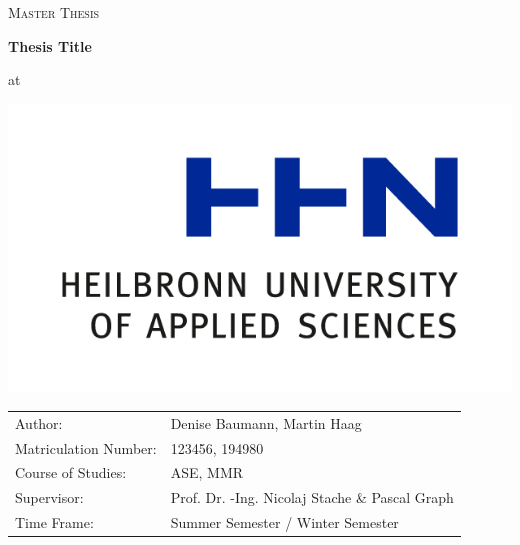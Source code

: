 \thispagestyle{title_page}
\vspace*{2cm}
\begin{center}
{\scshape\LARGE Master Thesis \par}
\vspace{1cm}
{\huge\bfseries Thesis Title\par}
\vspace{1.5cm}
{\large at \par}
\vspace {1cm}
\includegraphics[width=0.6\linewidth]{images/HHNLogo}
\end{center}
\vfill
\null
\begin{tabular}{l l}
Author: & Denise Baumann, Martin Haag\\
Matriculation Number: & 123456, 194980\\
Course of Studies: & ASE, MMR\\
Supervisor: & Prof. Dr. -Ing. Nicolaj Stache \& Pascal Graph \\
Time Frame: & Summer Semester / Winter Semester 
\end{tabular}


